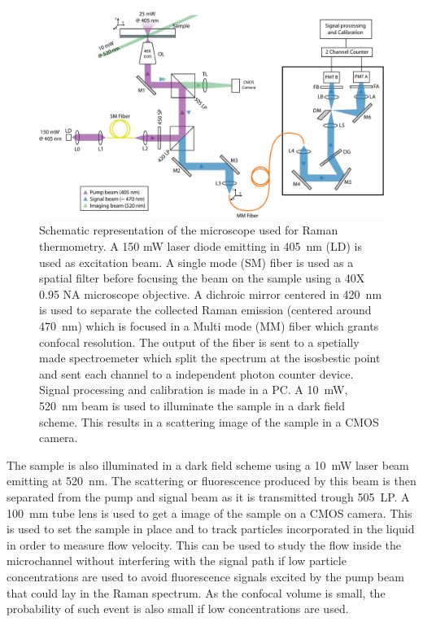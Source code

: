 \documentclass[]{spie}  %
\begin{document}
\begin{figure}[h!]
\centering
\includegraphics[width =\textwidth]{figs/setup.pdf}
\caption{Schematic representation of the microscope used for Raman thermometry. A 150 mW laser diode emitting in 405~nm (LD) is used as excitation beam. A single mode (SM) fiber is used as a spatial filter before focusing the beam on the sample using a 40X 0.95 NA microscope objective. A dichroic mirror centered in 420~nm is used to separate the collected Raman emission (centered around 470~nm) which is focused in a Multi mode (MM) fiber which grants confocal resolution. The output of the fiber is sent to a spetially made spectroemeter which split the spectrum at the isosbestic point and sent each channel to a independent photon counter device. Signal processing and calibration is made in a PC. A 10~mW, 520~nm beam is used to illuminate the sample in a dark field scheme. This results in a scattering image of the sample in a CMOS camera.
\label{fig:setup}}
\end{figure}

The sample is also illuminated in a dark field scheme using a 10~mW laser beam emitting at 520~nm. The scattering or fluorescence produced by this beam is then separated from the pump and signal beam as it is transmitted trough 505~LP. A 100~mm tube lens is used to get a image of the sample on a CMOS camera. This is used to set the sample in place and to track particles incorporated in the liquid in order to measure flow velocity. This can be used to study the flow inside the microchannel without interfering with the signal path if low particle concentrations are used to avoid fluorescence signals excited by the pump beam that could lay in the Raman spectrum. As the confocal volume is small, the probability of such event is also small if low concentrations are used.   
\end{document}
